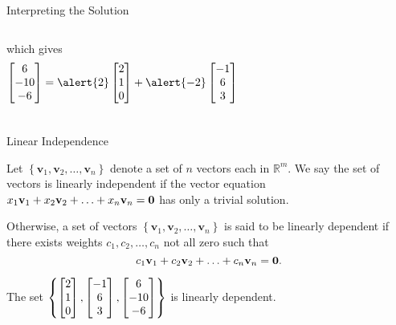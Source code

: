 \documentclass[xcolor=dvipsnames,aspectratio=169,t]{beamer}
\begin{document}
\begin{frame}{Interpreting the Solution}
\begin{columns}
  which gives
    \[  \begin{bmatrix}  6 \\ -10 \\ -6 \end{bmatrix} =  \alert{2} \begin{bmatrix} 2 \\ 1 \\ 0 \end{bmatrix}  +
 \alert{-2} \begin{bmatrix} -1 \\ 6 \\ 3 \end{bmatrix} \]

\end{columns}

 
 \end{frame}

\begin{frame}{Linear Independence}

  \bbox
  Let $\left\{ \mathbf{v}_1 ,  \mathbf{v}_2, \ldots ,  \mathbf{v}_n \right\}$ denote a set of $n$ vectors each in $\mathbb{R}^m$. We say the set of vectors is \alert{linearly independent} if the vector equation $\displaystyle x_1  \mathbf{v}_1 + x_2  \mathbf{v}_2  + \ldots + x_n  \mathbf{v}_n = \mathbf{0}$ \alert{has only a trivial solution}.

  \ms

  Otherwise, a set of vectors $\left\{ \mathbf{v}_1 ,  \mathbf{v}_2, \ldots ,  \mathbf{v}_n \right\}$ is said to be \alert{linearly dependent} if there exists weights $c_1, c_2, \ldots, c_n$ \alert{not all zero} such that
  \[ c_1  \mathbf{v}_1 + c_2  \mathbf{v}_2  + \ldots + c_n  \mathbf{v}_n = \mathbf{0}. \]
  \ebox

  \begin{example}
    The set $\displaystyle \left\{ \begin{bmatrix} 2 \\ 1 \\ 0 \end{bmatrix} , \begin{bmatrix} -1 \\ 6 \\ 3 \end{bmatrix} ,
    \begin{bmatrix}  6 \\ -10 \\ -6 \end{bmatrix} \right\}$ is \alert{linearly dependent}.
    \end{example}
  
  \end{frame}
\end{document}
